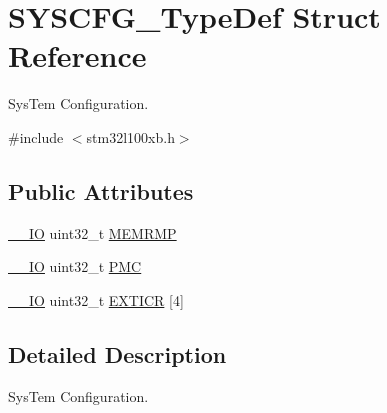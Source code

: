 \hypertarget{struct_s_y_s_c_f_g___type_def}{\section{S\-Y\-S\-C\-F\-G\-\_\-\-Type\-Def Struct Reference}
\label{struct_s_y_s_c_f_g___type_def}
}


Sys\-Tem Configuration.  




{\ttfamily \#include $<$stm32l100xb.\-h$>$}

\subsection*{Public Attributes}
\begin{DoxyCompactItemize}
\item 
\hyperlink{core__sc300_8h_aec43007d9998a0a0e01faede4133d6be}{\-\_\-\-\_\-\-I\-O} uint32\-\_\-t \hyperlink{struct_s_y_s_c_f_g___type_def_a85b9d3df2274b730327b181c402a7bf5}{M\-E\-M\-R\-M\-P}
\item 
\hyperlink{core__sc300_8h_aec43007d9998a0a0e01faede4133d6be}{\-\_\-\-\_\-\-I\-O} uint32\-\_\-t \hyperlink{struct_s_y_s_c_f_g___type_def_ab5c47c570566cb8ff9d0436c17cc9241}{P\-M\-C}
\item 
\hyperlink{core__sc300_8h_aec43007d9998a0a0e01faede4133d6be}{\-\_\-\-\_\-\-I\-O} uint32\-\_\-t \hyperlink{struct_s_y_s_c_f_g___type_def_a348aafac7a09a6e93e73e5acbccc34d3}{E\-X\-T\-I\-C\-R} \mbox{[}4\mbox{]}
\end{DoxyCompactItemize}


\subsection{Detailed Description}
Sys\-Tem Configuration. 

